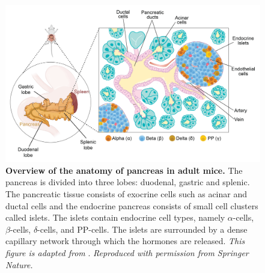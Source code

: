 \begin{figure}[t]
\centering
\includegraphics[width=\linewidth]{Chapter1/Fig/F1-1-01.png}
\caption[Overview of the anatomy of pancreas in adult mice.]{\textbf{Overview of the anatomy of pancreas in adult mice.} The pancreas is divided into three lobes: duodenal, gastric and splenic. The pancreatic tissue consists of exocrine cells such as acinar and ductal cells and the endocrine pancreas consists of small cell clusters called islets. The islets contain endocrine cell types, namely $\alpha$-cells, $\beta$-cells, $\delta$-cells, and PP-cells. The islets are surrounded by a dense capillary network through which the hormones are released. \textit{This figure is adapted from }\textbf{\cite{shih_pancreas_2013,jain_targeting_2022}}.\textit{ Reproduced with permission from Springer Nature.}}
\label{fig1-1}
\end{figure}




